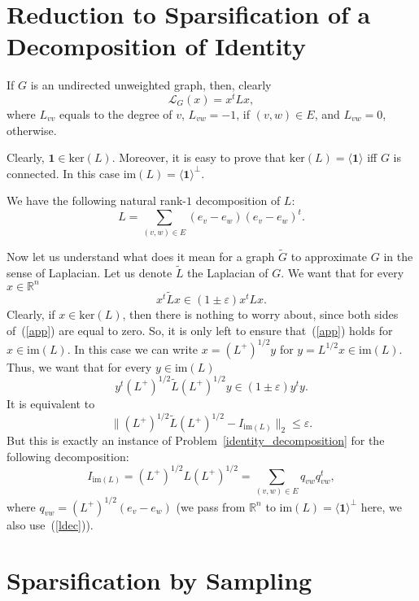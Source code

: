 \documentclass[12pt]{article}
\newcommand{\Rbb}{\mathbb{R}}
\newcommand{\eps}{\varepsilon}
\begin{document}
    \section{Reduction to Sparsification of a Decomposition of Identity}
    \label{reduction_unity}

    If $G$ is an undirected unweighted graph, then, clearly
    $$
        \mathcal{L}_G(x) = x^t L x,
    $$
    where $L_{vv}$ equals to the degree of $v$, $L_{vw} = -1$, if $(v, w) \in E$, and
    $L_{vw} = 0$, otherwise.

    Clearly, $\mathbf{1} \in \mathrm{ker}(L)$. Moreover, it is easy to prove that
    $\mathrm{ker}(L) = \langle \mathbf{1} \rangle$ iff $G$ is connected.
    In this case $\mathrm{im}(L) = \langle\mathbf{1}\rangle^{\perp}$.

    We have the following natural rank-$1$ decomposition of $L$:
    \begin{equation}
        \label{ldec}
        L = \sum_{(v, w) \in E} (e_v - e_w) (e_v - e_w)^t.
    \end{equation}

    Now let us understand what does it mean for a graph $\tilde{G}$ to approximate
    $G$ in the sense of Laplacian. Let us denote $\tilde{L}$ the Laplacian of $G$.
    We want that for every $x \in \Rbb^n$
    \begin{equation}
        \label{app}
        x^t \tilde{L} x \in (1 \pm \eps) x^t L x.
    \end{equation}
    Clearly, if $x \in \mathrm{ker}(L)$, then there is nothing to worry about, since
    both sides of~(\ref{app}) are equal to zero. So, it is only left to ensure
    that~(\ref{app}) holds for $x \in \mathrm{im}(L)$.
    In this case we can write $x = (L^+)^{1/2} y$ for
    $y = L^{1/2} x \in \mathrm{im}(L)$.
    Thus, we want that for every $y \in \mathrm{im}(L)$
    $$
        y^t (L^+)^{1/2} \tilde{L} (L^+)^{1/2} y \in (1 \pm \eps) y^t y.
    $$
    It is equivalent to
    $$
        \|(L^+)^{1/2} \tilde{L} (L^+)^{1/2} - I_{\mathrm{im}(L)}\|_2 \leq \eps.
    $$
    But this is exactly an instance of Problem~\ref{identity_decomposition} for
    the following decomposition:
    $$
        I_{\mathrm{im}(L)} = (L^+)^{1/2} L (L^+)^{1/2} = \sum_{(v,w) \in E} q_{vw} q_{vw}^t,
    $$
    where $q_{vw} = (L^+)^{1/2} (e_v - e_w)$ (we pass from $\mathbb{R}^n$ to
    $\mathrm{im}(L) = \langle \mathbf{1} \rangle^{\perp}$ here, we also use~(\ref{ldec})).

    \section{Sparsification by Sampling}
    \label{resistances}
\end{document}
